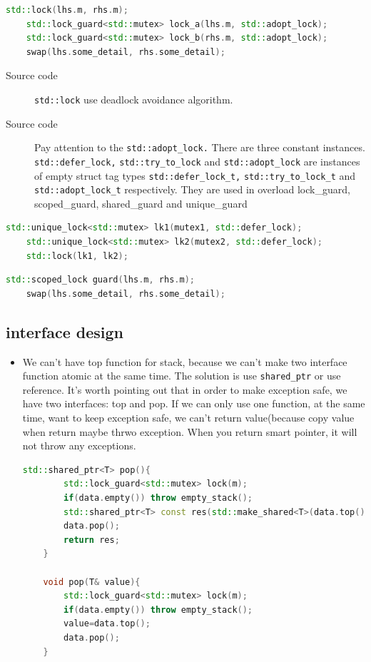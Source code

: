 \documentclass[a4paper,11pt,twoside]{book}
\begin{document}
\begin{itemize}
\begin{lstlisting}[frame=single, language=c++]
	std::lock(lhs.m, rhs.m);
	std::lock_guard<std::mutex> lock_a(lhs.m, std::adopt_lock);
	std::lock_guard<std::mutex> lock_b(rhs.m, std::adopt_lock);
	swap(lhs.some_detail, rhs.some_detail);
\end{lstlisting}
\begin{description}
	\item[Source code] \texttt{std::lock} use deadlock avoidance algorithm. 
	\item[Source code] Pay attention to the \texttt{std::adopt\_lock.} There are three constant instances. \texttt{std::defer\_lock,} \texttt{std::try\_to\_lock} and \texttt{std::adopt\_lock} are instances of empty struct tag types \texttt{std::defer\_lock\_t,} \texttt{std::try\_to\_lock\_t} and \texttt{std::adopt\_lock\_t} respectively. They are used in overload lock\_guard, scoped\_guard, shared\_guard and unique\_guard
\end{description}


\begin{lstlisting}[frame=single, language=c++]	
	std::unique_lock<std::mutex> lk1(mutex1, std::defer_lock);
	std::unique_lock<std::mutex> lk2(mutex2, std::defer_lock);
	std::lock(lk1, lk2);
\end{lstlisting}


\begin{lstlisting}[frame=single, language=c++]
	std::scoped_lock guard(lhs.m, rhs.m);
	swap(lhs.some_detail, rhs.some_detail);
\end{lstlisting}	
	
\end{itemize}

\subsection{interface design}
\begin{itemize}
	
	\item We can't have top function for stack, because we can't make two interface function atomic at the same time. The solution is use \texttt{shared\_ptr} or use reference. It's worth pointing out that in order to make exception safe, we have two interfaces: top and pop. If we can only use one function, at the same time, want to keep exception safe, we can't return value(because copy value when return maybe thrwo exception. When you return smart pointer, it will not throw any exceptions.
	
\begin{lstlisting}[frame=single, language=c++]
	std::shared_ptr<T> pop(){
		std::lock_guard<std::mutex> lock(m);
		if(data.empty()) throw empty_stack();
		std::shared_ptr<T> const res(std::make_shared<T>(data.top()));
		data.pop();
		return res;
	}
	
	void pop(T& value){
		std::lock_guard<std::mutex> lock(m);
		if(data.empty()) throw empty_stack();
		value=data.top();
		data.pop();
	}	
\end{lstlisting}	
	
\end{itemize}
\end{document}
